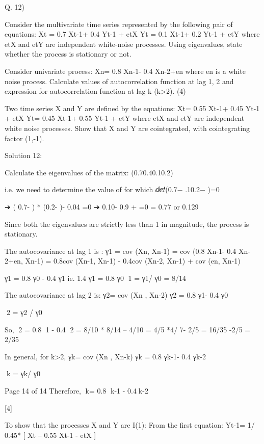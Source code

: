 
Q. 12)
\item  Consider the multivariate time series represented by the following pair of equations:
Xt = 0.7 Xt-1+ 0.4 Yt-1 + etX
Yt = 0.1 Xt-1+ 0.2 Yt-1 + etY
where etX and etY are independent white-noise processes. Using eigenvalues, state whether the process is stationary or not.

\item   Consider univariate process:
Xn= 0.8 Xn-1- 0.4 Xn-2+en
where en is a white noise process.
Calculate values of autocorrelation function at lag 1, 2 and expression for autocorrelation function at lag k (k>2).
(4)
\item   Two time series X and Y are defined by the equations:
Xt= 0.55 Xt-1+ 0.45 Yt-1 + etX
Yt= 0.45 Xt-1+ 0.55 Yt-1 + etY
where etX and etY are independent white noise processes.
Show that X and Y are cointegrated, with cointegrating factor (1,-1).

Solution 12:
\item 
Calculate the eigenvalues of the matrix:
(0.70.40.10.2)

i.e. we need to determine the value of \lambda for which ⅆⅇ𝑡(0.7− .10.2− \lambda)=0

➔ ( 0.7- \lambda) * (0.2- \lambda)- 0.04 =0
➔ 0.10- 0.9 \lambda +  =0
\lambda = 0.77 or 0.129

Since both the eigenvalues are strictly less than 1 in magnitude, the process is stationary.


\item  
The autocovariance at lag 1 is :
γ1 = cov (Xn, Xn-1)
= cov (0.8 Xn-1- 0.4 Xn-2+en, Xn-1)
= 0.8cov (Xn-1, Xn-1) - 0.4cov (Xn-2, Xn-1) + cov (en, Xn-1)

γ1 = 0.8 γ0 - 0.4 γ1
ie. 1.4 γ1 = 0.8 γ0
1 = γ1/ γ0 = 8/14

The autocovariance at lag 2 is:
γ2= cov (Xn , Xn-2)
γ2 = 0.8 γ1- 0.4 γ0

2 = γ2 / γ0

So, 2 = 0.8 1 - 0.4
2 = 8/10 * 8/14 – 4/10
= 4/5 *4/ 7- 2/5
= 16/35 -2/5
= 2/35

In general, for k>2,
γk= cov (Xn , Xn-k)
γk = 0.8 γk-1- 0.4 γk-2

k = γk/ γ0

Page 14 of 14
Therefore,
k= 0.8 k-1 - 0.4k-2

[4]
\item  
To show that the processes X and Y are I(1):
From the first equation:
Yt-1= 1/ 0.45* [ Xt – 0.55 Xt-1 - etX ]

